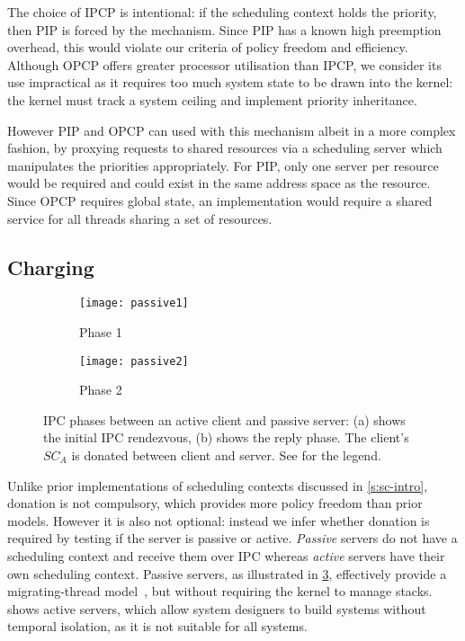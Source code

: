 The choice of \gls{IPCP} is intentional: if the scheduling context holds the priority, then \gls{PIP}
is forced by the mechanism. Since \gls{PIP} has a known high preemption overhead, this would violate
our criteria of policy freedom and efficiency.  
Although \gls{OPCP} offers greater processor utilisation than \gls{IPCP}, we consider its use impractical as it requires too much system state to be drawn into the kernel: the kernel must track a system ceiling and implement priority inheritance.

However \gls{PIP} and \gls{OPCP} can used with this mechanism albeit in a more complex fashion, by
proxying requests to shared resources via a scheduling server which manipulates the priorities
appropriately. For \gls{PIP}, only one server per resource would be required and could exist in the
same address space as the resource. Since \gls{OPCP} requires global state, an implementation would
require a shared service for all threads sharing a set of resources.

\subsection{Charging}

\begin{figure}
    \centering
    \begin{subfigure}[h]{0.48\textwidth}
        \centering
        \texttt{[image: passive1]}
        \caption{Phase 1}
        \label{f:passive1}
    \end{subfigure}%
    \begin{subfigure}[h]{0.48\textwidth}
        \centering
        \texttt{[image: passive2]}
        \caption{Phase 2}
        \label{f:passive2}
    \end{subfigure}
    \label{f:passive}
    \caption{IPC phases between an active client and passive server: (a) shows the initial IPC rendezvous, (b) shows the
    reply phase. The client's $SC_{A}$ is donated between client and server. See  for the legend.}
\end{figure}


Unlike prior implementations of scheduling contexts discussed in \cref{s:sc-intro},
donation is not compulsory, which provides more policy freedom than prior models.
However it is also not optional: instead we infer whether donation is required by testing 
if the server is passive or active. \emph{Passive} servers do not have a scheduling context 
and receive them over \gls{IPC} whereas \emph{active} servers have their own scheduling context. 
Passive servers, as illustrated in \cref{f:passive}, effectively provide a migrating-thread
model~\citep{Ford_Lepreau_94, Gabber_SBBS_99}, but without requiring
the kernel to manage stacks.  shows active servers, which allow system designers to
build systems without temporal isolation, as it is not suitable
for all systems.

